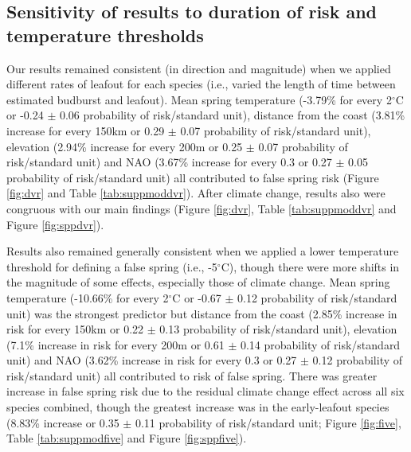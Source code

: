 \documentclass{article}\usepackage[]{graphicx}\usepackage[]{color}
\begin{document}
\subsection*{Sensitivity of results to duration of risk and temperature thresholds}
Our results remained consistent (in direction and magnitude) when we applied different rates of leafout for each species (i.e., varied the length of time between estimated budburst and leafout). Mean spring temperature (-3.79\% for every 2$^\circ$C or -0.24 $\pm$ 0.06 probability of risk/standard unit), distance from the coast (3.81\% increase for every 150km or 0.29 $\pm$ 0.07 probability of risk/standard unit), elevation (2.94\% increase for every 200m or 0.25 $\pm$ 0.07 probability of risk/standard unit) and NAO (3.67\% increase for every 0.3 or 0.27 $\pm$ 0.05 probability of risk/standard unit) all contributed to false spring risk (Figure \ref{fig:dvr} and Table \ref{tab:suppmoddvr}). After climate change, results also were congruous with our main findings (Figure \ref{fig:dvr}, Table \ref{tab:suppmoddvr} and Figure \ref{fig:sppdvr}).  

Results also remained generally consistent when we applied a lower temperature threshold for defining a false spring (i.e., -5$^{\circ}$C), though there were more shifts in the magnitude of some effects, especially those of climate change. Mean spring temperature (-10.66\% for every 2$^\circ$C or -0.67 $\pm$ 0.12 probability of risk/standard unit) was the strongest predictor but distance from the coast (2.85\% increase in risk for every 150km or 0.22 $\pm$ 0.13 probability of risk/standard unit), elevation (7.1\% increase in risk for every 200m or 0.61 $\pm$ 0.14 probability of risk/standard unit) and NAO (3.62\% increase in risk for every 0.3 or 0.27 $\pm$ 0.12 probability of risk/standard unit) all contributed to risk of false spring. There was greater increase in false spring risk due to the residual climate change effect across all six species combined, though the greatest increase was in the early-leafout species (8.83\% increase or 0.35 $\pm$ 0.11 probability of risk/standard unit; Figure \ref{fig:five}, Table \ref{tab:suppmodfive} and Figure \ref{fig:sppfive}). 
\end{document}

